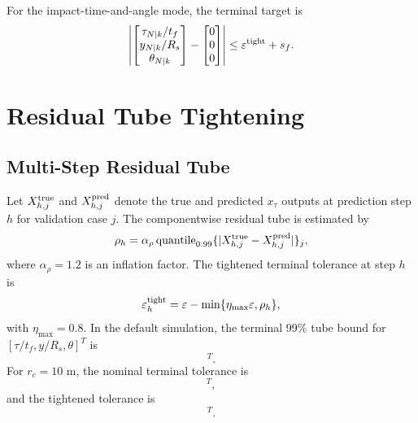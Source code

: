 \documentclass[letterpaper,journal]{IEEEtran}
\begin{document}
For the impact-time-and-angle mode, the terminal target is
\begin{equation}
    \left|
    \begin{bmatrix}
    \tau_{N|k}/t_f\\ y_{N|k}/R_s\\ \theta_{N|k}
    \end{bmatrix}
    -
    \begin{bmatrix}
    0\\0\\0
    \end{bmatrix}
    \right|
    \le \varepsilon^{\rm tight}+s_f .
\end{equation}
\section{Residual Tube Tightening}

\subsection{Multi-Step Residual Tube}
Let $X_{h,j}^{\rm true}$ and $X_{h,j}^{\rm pred}$ denote the true and predicted $x_\tau$ outputs at prediction step $h$ for validation case $j$. The componentwise residual tube is estimated by
\begin{equation}
    \rho_h=\alpha_\rho\operatorname{quantile}_{0.99}
    \{|X_{h,j}^{\rm true}-X_{h,j}^{\rm pred}|\}_j ,
    \label{eq:tube_bound}
\end{equation}
where $\alpha_\rho=1.2$ is an inflation factor. The tightened terminal tolerance at step $h$ is
\begin{equation}
    \varepsilon_h^{\rm tight}=
    \varepsilon-\min\{\eta_{\max}\varepsilon,\rho_h\},
    \label{eq:tightening}
\end{equation}
with $\eta_{\max}=0.8$. In the default simulation, the terminal 99\% tube bound for $[\tau/t_f,y/R_s,\theta]^T$ is
\begin{equation}
    [7.199{\times}10^{-5},\;8.467{\times}10^{-5},\;4.036{\times}10^{-7}]^T .
\end{equation}
For $r_c=10$ m, the nominal terminal tolerance is
\begin{equation}
    [1.536{\times}10^{-3},\;1.667{\times}10^{-3},\;5.236{\times}10^{-2}]^T,
\end{equation}
and the tightened tolerance is
\begin{equation}
    [1.464{\times}10^{-3},\;1.582{\times}10^{-3},\;5.236{\times}10^{-2}]^T .
\end{equation}
\end{document}
